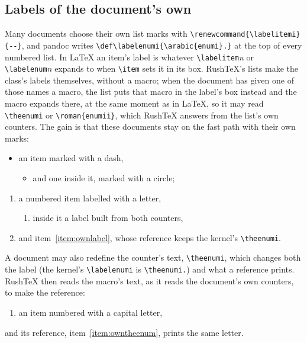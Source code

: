 \documentclass{article}
\numberwithin{equation}{section}
\theoremstyle{definition}
\theoremstyle{remark}
\begin{document}
\subsection{Labels of the document's own}\label{sec:ownlabels}
Many documents choose their own list marks with \verb|\renewcommand{\labelitemi}{--}|,
and pandoc writes \verb|\def\labelenumi{\arabic{enumi}.}| at the top of every numbered
list. In \LaTeX{} an item's label is whatever \verb|\labelitem|\textit{n} or
\verb|\labelenum|\textit{n} expands to when \verb|\item| sets it in its box. RushTeX's
lists make the class's labels themselves, without a macro; when the document has given
one of those names a macro, the list puts that macro in the label's box instead and the
macro expands there, at the same moment as in \LaTeX{}, so it may read
\verb|\theenumi| or \verb|\roman{enumii}|, which RushTeX answers from the list's own
counters. The gain is that these documents stay on the fast path with their own marks:
\begin{itemize}
\renewcommand{\labelitemi}{--}
\renewcommand{\labelitemii}{$\circ$}
\item an item marked with a dash,
  \begin{itemize}
  \item and one inside it, marked with a circle;
  \end{itemize}
\end{itemize}
\begin{enumerate}
\def\labelenumi{\alph{enumi})}
\def\labelenumii{\theenumi.\arabic{enumii}}
\item a numbered item labelled with a letter,\label{item:ownlabel}
  \begin{enumerate}
  \item inside it a label built from both counters,
  \end{enumerate}
\item and item~\ref{item:ownlabel}, whose reference keeps the kernel's \verb|\theenumi|.
\end{enumerate}
A document may also redefine the counter's text, \verb|\theenumi|, which changes both
the label (the kernel's \verb|\labelenumi| is \verb|\theenumi.|) and what a reference
prints. RushTeX then reads the macro's text, as it reads the document's own counters,
to make the reference:
{\renewcommand{\theenumi}{\Alph{enumi}}
\begin{enumerate}
\item an item numbered with a capital letter,\label{item:owntheenum}
\end{enumerate}}
\noindent and its reference, item~\ref{item:owntheenum}, prints the same letter.
\end{document}

